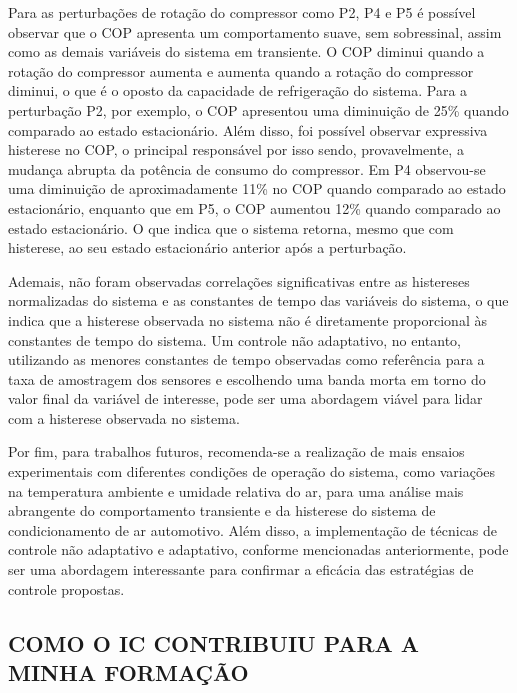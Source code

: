 Para as perturbações de rotação do compressor como P2, P4 e P5 é possível observar que o COP apresenta um comportamento suave, sem sobressinal, assim como as demais variáveis do sistema em transiente. O COP diminui quando a rotação do compressor aumenta e aumenta quando a rotação do compressor diminui, o que é o oposto da capacidade de refrigeração do sistema. Para a perturbação P2, por exemplo, o COP apresentou uma diminuição de 25\% quando comparado ao estado estacionário. 
\newpage
Além disso, foi possível observar expressiva histerese no COP, o principal responsável por isso sendo, provavelmente, a mudança abrupta da potência de consumo do compressor. Em P4  observou-se uma diminuição de aproximadamente 11\% no COP quando comparado ao estado estacionário, enquanto que em P5, o COP aumentou 12\% quando comparado ao estado estacionário.  O que indica que o sistema retorna, mesmo que com histerese, ao seu estado estacionário anterior após a perturbação.

Ademais, não foram observadas correlações significativas entre as histereses normalizadas do sistema e as constantes de tempo das variáveis do sistema, o que indica que a histerese observada no sistema não é diretamente proporcional às constantes de tempo do sistema. Um controle não adaptativo, no entanto, utilizando as menores constantes de tempo observadas como referência para a taxa de amostragem dos sensores e escolhendo uma banda morta em torno do valor final da variável de interesse, pode ser uma abordagem viável para lidar com a histerese observada no sistema.

Por fim, para trabalhos futuros, recomenda-se a realização de mais ensaios experimentais com diferentes condições de operação do sistema, como variações na temperatura ambiente e umidade relativa do ar, para uma análise mais abrangente do comportamento transiente e da histerese do sistema de condicionamento de ar automotivo. Além disso, a implementação de técnicas de controle não adaptativo e adaptativo, conforme mencionadas anteriormente, pode ser uma abordagem interessante para confirmar a eficácia das estratégias de controle propostas.

\newpage
\subsection{\MakeUppercase{ Como o IC Contribuiu para a Minha Formação}}

